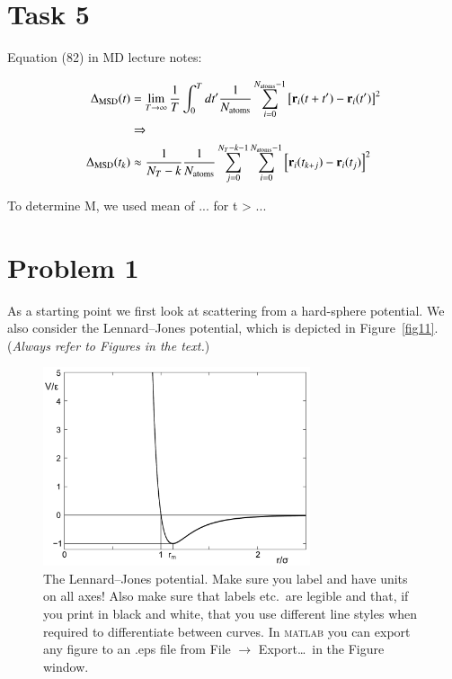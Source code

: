 \section*{Task 5}
Equation (82) in MD lecture notes:


\begin{align}
\Delta_{\rm MSD}(t) &= \lim_{T \rightarrow \infty} \frac{1}{T} \int_0^{T} d t' \frac{1}{N_{\rm atoms}} \sum_{i=0}^{N_{\rm atoms}-1} \left[{\bf r}_i(t+t') - {\bf r}_i(t') \right]^2 \\ &\Rightarrow \nonumber
\\
\Delta_{\rm MSD}(t_k) &\approx
\frac{1}{N_T -k}\frac{1}{N_{\rm atoms}} \sum_{j=0}^{N_T-k-1} \sum_{i=0}^{N_{\rm atoms}-1} \left[{\bf r}_i(t_{k+j}) - {\bf r}_i(t_j) \right]^2 
\end{align}

To determine M, we used mean of ... for t > ... 

\section*{Problem 1}
As a starting point we first look at scattering from a hard-sphere
potential. We also consider the Lennard--Jones potential, which is depicted
in Figure~\ref{fig11}. (\emph{Always refer to Figures in the text.})

\begin{figure}[!ht]
\begin{center}
  \includegraphics[width=0.7\textwidth]{template_files/LJ} 
  \caption{The Lennard--Jones potential.
  Make sure you label and have units on all axes! Also make sure that labels etc.\
  are legible and that, if you print in black and white, that you use different line
  styles when required to differentiate between curves. In \textsc{matlab}
  you can export any figure to an .eps file from File $\rightarrow$
  Export\ldots\ in the Figure window.}
  \label{fig1}
\end{center}
\end{figure}
  
